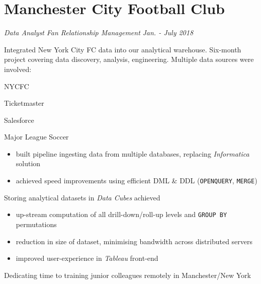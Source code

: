 \documentclass[../cv.tex]{subfiles}
\begin{document}
\section{Manchester City Football Club}
\textit{Data Analyst}
\hfill
\textit{Fan Relationship Management}
\hfill
\textit{Jan. - July 2018}
\begin{description}[style=multiline,leftmargin=3cm]
	\item[NYCFC ETL \textnormal{\\Project Owner}]
	      Integrated New York City FC  data into our analytical warehouse.
	      Six-month project covering data discovery, analysis, engineering.
	      Multiple data sources were involved:
	      \begin{itemize*}
		      \item NYCFC
		      \item Ticketmaster
		      \item Salesforce
		      \item Major League Soccer
	      \end{itemize*}
	      \begin{description}[style=multiline,leftmargin=3cm]
		      \item[Data Pipeline]
		            {
		            \begin{itemize}
			            \item built pipeline ingesting data from multiple databases, replacing \textit{Informatica} solution
			            \item achieved speed improvements using efficient DML \& DDL (\texttt{OPENQUERY}, \texttt{MERGE})
		            \end{itemize}
		            }
		      \item[Data Cubes]
		            Storing analytical datasets in \textit{Data Cubes} achieved
		            \begin{itemize}
			            \item up-stream computation of all drill-down/roll-up levels and \texttt{GROUP BY} permutations
			            \item reduction in size of dataset, minimising bandwidth across distributed servers
			            \item improved user-experience in \textit{Tableau} front-end
		            \end{itemize}
		      \item[Training]
		            Dedicating time to training junior colleagues remotely in Manchester/New York
		            \begin{itemize}

\end{itemize}
\end{description}
\end{description}
\end{document}
